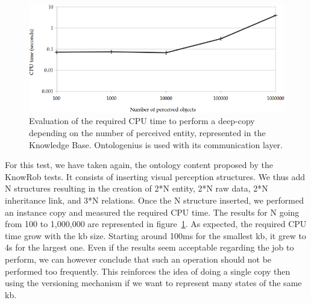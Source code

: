 \begin{figure}[ht!]
\centering
\includegraphics[width=\textwidth]{figures/chapter2/extra_tests/deepcopy.png}
\caption{\label{fig:chap2_extra_deepcopy} Evaluation of the required CPU time to perform a deep-copy depending on the number of perceived entity, represented in the Knowledge Base. Ontologenius is used with its communication layer. }
\end{figure}

For this test, we have taken again, the ontology content proposed by the KnowRob tests. It consists of inserting visual perception structures. We thus add N structures resulting in the creation of 2*N entity, 2*N raw data, 2*N inheritance link, and 3*N relations. Once the N structure inserted, we performed an instance copy and measured the required CPU time. The results for N going from 100 to 1,000,000 are represented in figure~\ref{fig:chap2_extra_deepcopy}. As expected, the required CPU time grow with the \acrshort{kb} size. Starting around 100ms for the smallest \acrshort{kb}, it grew to 4s for the largest one. Even if the results seem acceptable regarding the job to perform, we can however conclude that such an operation should not be performed too frequently. This reinforces the idea of doing a single copy then using the versioning mechanism if we want to represent many states of the same \acrshort{kb}.